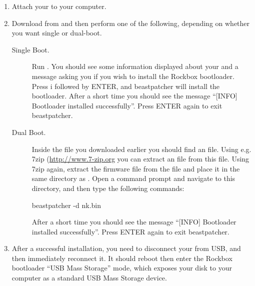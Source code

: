 \begin{enumerate}

\item Attach your \dap{} to your computer.

\item Download  from
and then perform one of the following, depending on whether you want single
or dual-boot.

\begin{description}
\item [Single Boot.] Run . You should see some
information displayed about
your \dap{} and a message asking you if you wish to install the Rockbox
bootloader. Press i followed by ENTER, and beastpatcher will
install the bootloader. After a short time you should see the message
``[INFO] Bootloader installed successfully''. Press ENTER again to exit
beastpatcher.

\item [Dual Boot.] Inside the  file you downloaded earlier
you should find an  file.  Using e.g. 7zip
(\url{http://www.7-zip.org} you can extract an  file from this
 file.  Using 7zip again, extract the \playerman{} firmware file
 from the  file and place it in the same
directory as .  Open a command prompt and navigate
to this directory, and then type the following commands:

\begin{code} 
    beastpatcher -d nk.bin
\end{code}

After a short time you should see the message
``[INFO] Bootloader installed successfully''. Press ENTER again to exit
beastpatcher.
\end{description}

\item After a successful installation, you need to disconnect your \dap{} from
USB, and then immediately reconnect it. It should reboot then enter the Rockbox
bootloader ``USB Mass Storage'' mode, which exposes your \daps{} disk to your
computer as a standard USB Mass Storage device.
\end{enumerate}

